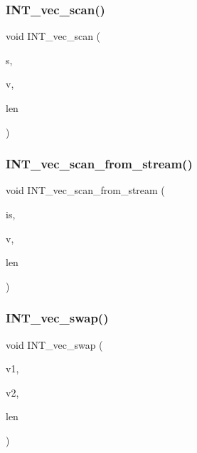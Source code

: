 \subsubsection{\texorpdfstring{I\+N\+T\+\_\+vec\+\_\+scan()}{INT\_vec\_scan()}}
{\footnotesize\ttfamily void I\+N\+T\+\_\+vec\+\_\+scan (\begin{DoxyParamCaption}\item[{const \mbox{\hyperlink{galois_8h_ab6cc7b4aeb6ea31aba2b3fbfc83ff5e6}{B\+Y\+TE}} $\ast$}]{s,  }\item[{\mbox{\hyperlink{galois_8h_a09fddde158a3a20bd2dcadb609de11dc}{I\+NT}} $\ast$\&}]{v,  }\item[{\mbox{\hyperlink{galois_8h_a09fddde158a3a20bd2dcadb609de11dc}{I\+NT}} \&}]{len }\end{DoxyParamCaption})}

\mbox{\label{util_8_c_a7dc639ea3d5da900adb978c9322353a7}} 
\subsubsection{\texorpdfstring{I\+N\+T\+\_\+vec\+\_\+scan\+\_\+from\+\_\+stream()}{INT\_vec\_scan\_from\_stream()}}
{\footnotesize\ttfamily void I\+N\+T\+\_\+vec\+\_\+scan\+\_\+from\+\_\+stream (\begin{DoxyParamCaption}\item[{istream \&}]{is,  }\item[{\mbox{\hyperlink{galois_8h_a09fddde158a3a20bd2dcadb609de11dc}{I\+NT}} $\ast$\&}]{v,  }\item[{\mbox{\hyperlink{galois_8h_a09fddde158a3a20bd2dcadb609de11dc}{I\+NT}} \&}]{len }\end{DoxyParamCaption})}

\mbox{\label{util_8_c_a30fa1617100277410252874a2c3b2950}} 
\subsubsection{\texorpdfstring{I\+N\+T\+\_\+vec\+\_\+swap()}{INT\_vec\_swap()}}
{\footnotesize\ttfamily void I\+N\+T\+\_\+vec\+\_\+swap (\begin{DoxyParamCaption}\item[{\mbox{\hyperlink{galois_8h_a09fddde158a3a20bd2dcadb609de11dc}{I\+NT}} $\ast$}]{v1,  }\item[{\mbox{\hyperlink{galois_8h_a09fddde158a3a20bd2dcadb609de11dc}{I\+NT}} $\ast$}]{v2,  }\item[{\mbox{\hyperlink{galois_8h_a09fddde158a3a20bd2dcadb609de11dc}{I\+NT}}}]{len }\end{DoxyParamCaption})}


